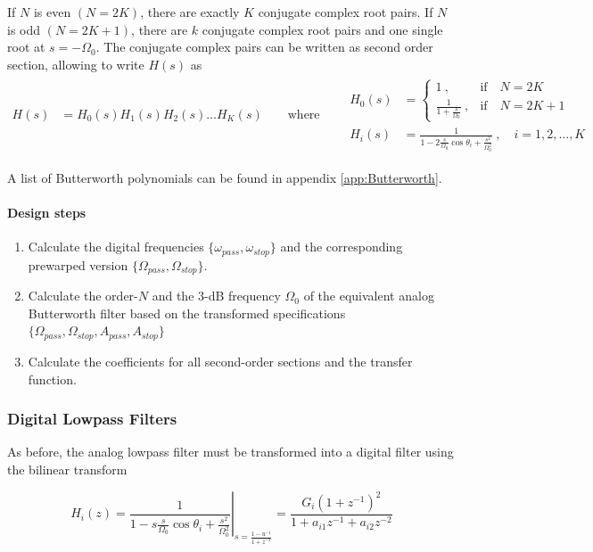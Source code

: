 If $N$ is even $(N = 2K)$, there are exactly $K$ conjugate complex root pairs.
If $N$ is odd $(N = 2K+1)$, there are $k$ conjugate complex root pairs and one
single root at $s = -\Omega_0$. The conjugate complex pairs can be written as
second order section, allowing to write $H(s)$ as \\

\begin{align*}
	H(s) &= H_0(s) H_1(s) H_2(s) \ldots H_K(s) \qquad \text{where} \qquad
	\begin{array}{ll}
		H_0(s) & = \begin{cases}
			1\:, & \text{if} \quad N = 2K \\
			\frac{1}{1 + \frac{s}{\Omega_0}} \:, & \text{if} \quad N = 2K+1
			\end{cases} \\
		H_i(s) &= \frac{1}{1 - 2 \frac{s}{\Omega_0} \cos\theta_i + \frac{s^2}{\Omega_0^2}} \:,\quad i=1,2,\ldots,K
	\end{array}
\end{align*}

A list of Butterworth polynomials can be found in appendix \ref{app:Butterworth}.

\paragraph{Design steps}
\begin{enumerate}
	\item Calculate the digital frequencies $\{\omega_{pass}, \omega_{stop}\}$ 
	and the corresponding prewarped version $\{\Omega_{pass}, \Omega_{stop}\}$.
	\item Calculate the order-$N$ and the 3-dB frequency $\Omega_0$ of the
	 equivalent analog Butterworth filter based on the transformed specifications
	 $\{\Omega_{pass}, \Omega_{stop}, A_{pass}, A_{stop} \}$
	\item Calculate the coefficients for all second-order sections and the transfer function.
\end{enumerate}

\subsubsection{Digital Lowpass Filters}
As before, the analog lowpass filter must be transformed into a digital
filter using the bilinear transform

\begin{equation*}
	H_i(z) = \left.\frac{1}{1 - s \frac{s}{\Omega_0}\cos\theta_i + \frac{s^2}{\Omega_0^2}}\right|_{s = \frac{1-u^{-1}}{1+z^{-1}}} = 
	\frac{G_i (1+z^{-1})^2}{1 + a_{i1}z^{-1} + a_{i2}z^{-2}}
\end{equation*}

